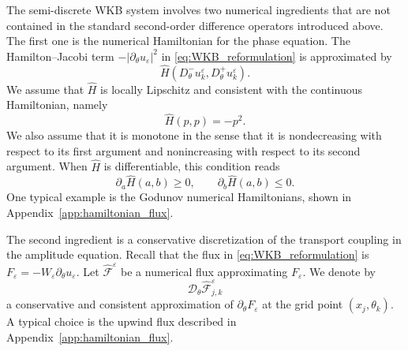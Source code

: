 \documentclass[11pt]{article}
\begin{document}
The semi-discrete WKB system involves two numerical ingredients that are not
contained in the standard second-order difference operators introduced above.
The first one is the numerical Hamiltonian for the phase equation. The
Hamilton--Jacobi term \(-|\partial_\theta u_\varepsilon|^2\) in \eqref{eq:WKB_reformulation} is approximated by
\[
\widehat H(D_\theta^-u_k^\varepsilon,D_\theta^+u_k^\varepsilon).
\]
We assume that \(\widehat H\) is locally Lipschitz and consistent with the
continuous Hamiltonian, namely
\[
\widehat H(p,p)=-p^2 .
\]
We also assume that it is monotone in the sense that it is nondecreasing with
respect to its first argument and nonincreasing with respect to its second
argument. When \(\widehat H\) is differentiable, this condition reads
\[
\partial_a\widehat H(a,b)\ge0,
\qquad
\partial_b\widehat H(a,b)\le0 .
\]
One typical example is the Godunov numerical Hamiltonians,
shown in Appendix~\ref{app:hamiltonian_flux}.


The second ingredient is a conservative discretization of the transport
coupling in the amplitude equation.  Recall that the  flux in \eqref{eq:WKB_reformulation} is
$
F_\varepsilon=-W_\varepsilon\partial_\theta u_\varepsilon .
$
Let $\widehat{\mathcal F}^{\varepsilon}$ be a numerical flux approximating
$F_\varepsilon$. 
We denote by
$$
\mathcal D_\theta \widehat{\mathcal F}^{\varepsilon}_{j,k}
$$
a conservative and consistent approximation of
$\partial_\theta F_\varepsilon$ at the grid point $(x_j,\theta_k)$.  A typical choice is the upwind flux described in
Appendix~\ref{app:hamiltonian_flux}.
\end{document}
